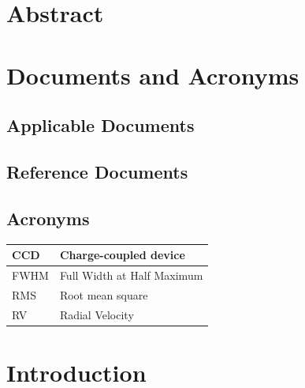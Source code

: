\documentclass[10pt,a4paper]{article}
\begin{document}


\section{Abstract}




\section{Documents and Acronyms}

\subsection{Applicable Documents}



\subsection{Reference Documents}



\subsection{Acronyms}

{
    \renewcommand{\arraystretch}{1.2}
    \begin{tabularx}{\textwidth}{| l | X |}
        \hline
        CCD   & Charge-coupled device                \\ \hline
        FWHM  & Full Width at Half Maximum           \\ \hline
        RMS   & Root mean square                     \\ \hline
        RV    & Radial Velocity                     \\ \hline
    \end{tabularx}
}


\newpage

\section{Introduction}
\end{document}
